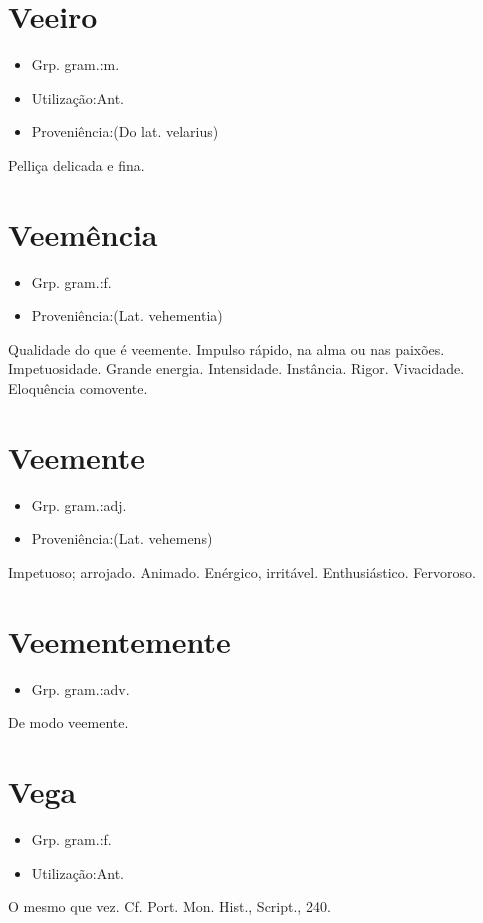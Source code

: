\documentclass{article}
\begin{document}
\section{Veeiro}
\begin{itemize}
\item {Grp. gram.:m.}
\end{itemize}
\begin{itemize}
\item {Utilização:Ant.}
\end{itemize}
\begin{itemize}
\item {Proveniência:(Do lat. \textunderscore velarius\textunderscore )}
\end{itemize}
Pelliça delicada e fina.
\section{Veemência}
\begin{itemize}
\item {Grp. gram.:f.}
\end{itemize}
\begin{itemize}
\item {Proveniência:(Lat. \textunderscore vehementia\textunderscore )}
\end{itemize}
Qualidade do que é veemente.
Impulso rápido, na alma ou nas paixões.
Impetuosidade.
Grande energia.
Intensidade.
Instância.
Rigor.
Vivacidade.
Eloquência comovente.
\section{Veemente}
\begin{itemize}
\item {Grp. gram.:adj.}
\end{itemize}
\begin{itemize}
\item {Proveniência:(Lat. \textunderscore vehemens\textunderscore )}
\end{itemize}
Impetuoso; arrojado.
Animado.
Enérgico, irritável.
Enthusiástico.
Fervoroso.
\section{Veementemente}
\begin{itemize}
\item {Grp. gram.:adv.}
\end{itemize}
De modo veemente.
\section{Vega}
\begin{itemize}
\item {Grp. gram.:f.}
\end{itemize}
\begin{itemize}
\item {Utilização:Ant.}
\end{itemize}
O mesmo que \textunderscore vez\textunderscore . Cf. \textunderscore Port. Mon. Hist.\textunderscore , \textunderscore Script.\textunderscore , 240.
\end{document}
